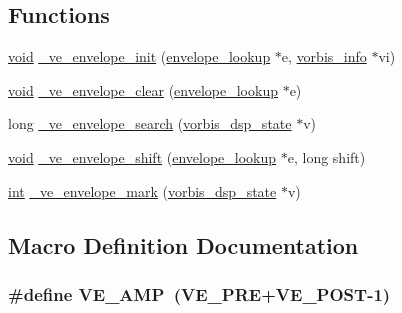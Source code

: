 \subsection*{Functions}
\begin{DoxyCompactItemize}
\item 
\hyperlink{sound_8c_ae35f5844602719cf66324f4de2a658b3}{void} \hyperlink{lib-src_2libvorbis_2lib_2_envelope_8h_aedc9746428d2a6117963e8dee322325e}{\+\_\+ve\+\_\+envelope\+\_\+init} (\hyperlink{structenvelope__lookup}{envelope\+\_\+lookup} $\ast$e, \hyperlink{structvorbis__info}{vorbis\+\_\+info} $\ast$vi)
\item 
\hyperlink{sound_8c_ae35f5844602719cf66324f4de2a658b3}{void} \hyperlink{lib-src_2libvorbis_2lib_2_envelope_8h_a8082a156ea0041c8fd6a32a7546ca3d1}{\+\_\+ve\+\_\+envelope\+\_\+clear} (\hyperlink{structenvelope__lookup}{envelope\+\_\+lookup} $\ast$e)
\item 
long \hyperlink{lib-src_2libvorbis_2lib_2_envelope_8h_a177b23eed4057ff521a5053a479ff66d}{\+\_\+ve\+\_\+envelope\+\_\+search} (\hyperlink{structvorbis__dsp__state}{vorbis\+\_\+dsp\+\_\+state} $\ast$v)
\item 
\hyperlink{sound_8c_ae35f5844602719cf66324f4de2a658b3}{void} \hyperlink{lib-src_2libvorbis_2lib_2_envelope_8h_aab5046c33ff5024cffb59d256999ca9d}{\+\_\+ve\+\_\+envelope\+\_\+shift} (\hyperlink{structenvelope__lookup}{envelope\+\_\+lookup} $\ast$e, long shift)
\item 
\hyperlink{xmltok_8h_a5a0d4a5641ce434f1d23533f2b2e6653}{int} \hyperlink{lib-src_2libvorbis_2lib_2_envelope_8h_ae37cff40382633516d101381a1fbb6c1}{\+\_\+ve\+\_\+envelope\+\_\+mark} (\hyperlink{structvorbis__dsp__state}{vorbis\+\_\+dsp\+\_\+state} $\ast$v)
\end{DoxyCompactItemize}


\subsection{Macro Definition Documentation}
\subsubsection[{\texorpdfstring{V\+E\+\_\+\+A\+MP}{VE_AMP}}]{\setlength{\rightskip}{0pt plus 5cm}\#define V\+E\+\_\+\+A\+MP~({\bf V\+E\+\_\+\+P\+RE}+{\bf V\+E\+\_\+\+P\+O\+ST}-\/1)}\hypertarget{lib-src_2libvorbis_2lib_2_envelope_8h_acf538c31f9e77691dbcb48a5a003759c}{}\label{lib-src_2libvorbis_2lib_2_envelope_8h_acf538c31f9e77691dbcb48a5a003759c}


